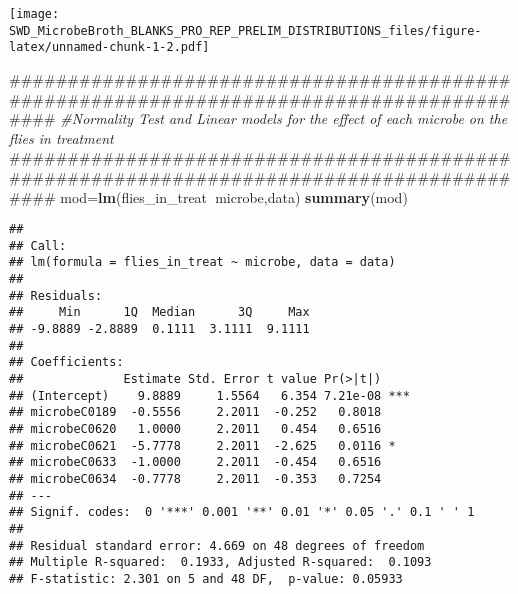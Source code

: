 \documentclass[]{article}
\newenvironment{Shaded}{\begin{snugshade}}{\end{snugshade}}
\newcommand{\KeywordTok}[1]{\textcolor[rgb]{0.13,0.29,0.53}{\textbf{#1}}}
\newcommand{\DataTypeTok}[1]{\textcolor[rgb]{0.13,0.29,0.53}{#1}}
\newcommand{\StringTok}[1]{\textcolor[rgb]{0.31,0.60,0.02}{#1}}
\newcommand{\CommentTok}[1]{\textcolor[rgb]{0.56,0.35,0.01}{\textit{#1}}}
\newcommand{\OperatorTok}[1]{\textcolor[rgb]{0.81,0.36,0.00}{\textbf{#1}}}
\newcommand{\NormalTok}[1]{#1}
\begin{document}
\begin{Shaded}
\end{Shaded}

\texttt{[image: SWD\_MicrobeBroth\_BLANKS\_PRO\_REP\_PRELIM\_DISTRIBUTIONS\_files/figure-latex/unnamed-chunk-1-2.pdf]}

\begin{Shaded}
\begin{Highlighting}[]
\NormalTok{##########################################################################################}
\CommentTok{#Normality Test and Linear models for the effect of each microbe on the flies in treatment}
\NormalTok{##########################################################################################}
\NormalTok{mod=}\KeywordTok{lm}\NormalTok{(flies_in_treat}\OperatorTok{~}\NormalTok{microbe,data)}
\KeywordTok{summary}\NormalTok{(mod)}
\end{Highlighting}
\end{Shaded}

\begin{verbatim}
## 
## Call:
## lm(formula = flies_in_treat ~ microbe, data = data)
## 
## Residuals:
##     Min      1Q  Median      3Q     Max 
## -9.8889 -2.8889  0.1111  3.1111  9.1111 
## 
## Coefficients:
##              Estimate Std. Error t value Pr(>|t|)    
## (Intercept)    9.8889     1.5564   6.354 7.21e-08 ***
## microbeC0189  -0.5556     2.2011  -0.252   0.8018    
## microbeC0620   1.0000     2.2011   0.454   0.6516    
## microbeC0621  -5.7778     2.2011  -2.625   0.0116 *  
## microbeC0633  -1.0000     2.2011  -0.454   0.6516    
## microbeC0634  -0.7778     2.2011  -0.353   0.7254    
## ---
## Signif. codes:  0 '***' 0.001 '**' 0.01 '*' 0.05 '.' 0.1 ' ' 1
## 
## Residual standard error: 4.669 on 48 degrees of freedom
## Multiple R-squared:  0.1933, Adjusted R-squared:  0.1093 
## F-statistic: 2.301 on 5 and 48 DF,  p-value: 0.05933
\end{verbatim}
\end{document}
